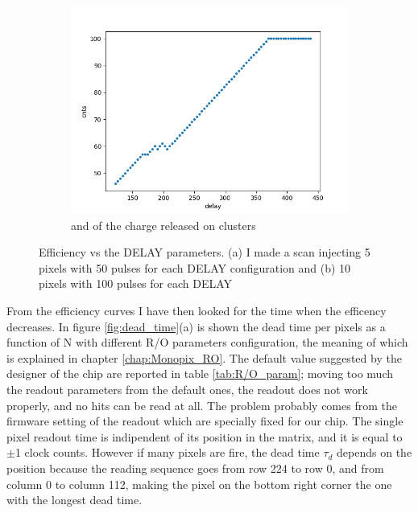 \begin{figure}
\begin{subfigure}[b]{0.49\textwidth}
                \includegraphics[width=\linewidth]{figures/charaterization/efficiency_10pixels.png}
                \caption{and of the charge released on clusters}
                \label{fig:efficiency_10_pixels}
            \end{subfigure}
            \caption{Efficiency vs the DELAY parameters. (a) I made a scan injecting 5 pixels with 50 pulses for each DELAY configuration and (b) 10 pixels with 100 pulses for each DELAY}
            \label{fig:efficiency_VS_delay}
        \end{figure} 

        From the efficiency curves I have then looked for the time when the efficency decreases. In figure \ref{fig:dead_time}(a) is shown the dead time per pixels as a function of N with different R/O parameters configuration, the meaning of which is explained in chapter \ref{chap:Monopix_RO}. The default value suggested by the designer of the chip are reported in table \ref{tab:R/O_param}; moving too much the readout parameters from the default ones, the readout does not work properly, and no hits can be read at all. The problem probably comes from the firmware setting of the readout which are specially fixed for our chip.
        The single pixel readout time is indipendent of its position in the matrix, and it is equal to $\pm$1 clock counts. However if many pixels are fire, the dead time $\tau_d$ depends on the position because the reading sequence goes from row 224 to row 0, and from column 0 to column 112, making the pixel on the bottom right corner the one with the longest dead time. 
       
